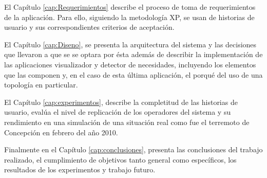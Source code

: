 El Capítulo \ref{cap:Requerimientos} describe el proceso de toma de requerimientos de la aplicación. Para ello, siguiendo la metodología XP, se usan de historias de usuario y sus correspondientes criterios de aceptación.

El Capítulo \ref{cap:Diseno}, se presenta la arquitectura del sistema y las decisiones que llevaron a que se se optara por ésta además de describir la implementación de las aplicaciones visualizador y detector de necesidades, incluyendo los elementos que las componen y, en el caso de esta última aplicación, el porqué del uso de una topología en particular.

El Capítulo \ref{cap:experimentos}, describe la completitud de las historias de usuario, evalúa el nivel de replicación de los operadores del sistema y su rendimiento en una simulación de una situación real como fue el terremoto de Concepción en febrero del año 2010.

Finalmente en el Capítulo \ref{cap:conclusiones}, presenta las conclusiones del trabajo realizado, el cumplimiento de objetivos tanto general como específicos, los resultados de los experimentos y trabajo futuro.